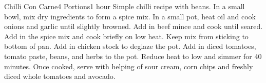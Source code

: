 \documentclass[11pt]{article}
\begin{document}
\begin{recipe}[ChilliConCarne]{Chilli Con Carne}{4 Portions}{1 hour}
    \freeform Simple chilli recipe with beans.
    In a small bowl, mix dry ingredients to form a spice mix.
    In a small pot, heat oil and cook onions and garlic until slightly browned.
    Add in beef mince and cook until seared. Add in the spice mix and cook briefly on low heat. Keep mix from sticking to bottom of pan.
    Add in chicken stock to deglaze the pot.
    Add in diced tomatoes, tomato paste, beans, and herbs to the pot. Reduce heat to low and simmer for 40 minutes.
    Once cooked, serve with helping of sour cream, corn chips and freshly diced whole tomatoes and avocado.
    \freeform\hrulefill
\end{recipe}
\end{document}

